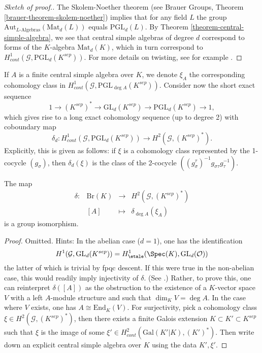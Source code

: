 \begin{proof}[Sketch of proof.]
The Skolem-Noether theorem (see
Brauer Groups, Theorem \ref{brauer-theorem-skolem-noether})
implies that for any field $L$ the group
$\text{Aut}_{L\text{-Algebras}}(\text{Mat}_d(L))$
equals $\text{PGL}_d(L)$. By
Theorem \ref{theorem-central-simple-algebra}, we see that
central simple algebras of degree $d$ correspond
to forms of the $K$-algebra $\text{Mat}_d(K)$, which in turn correspond to
$H_{cont}^1 (\mathcal{G}, \text{PGL}_d(K^{sep}))$. For more details on
twisting, see for example
\cite{SilvermanEllipticCurves}.
\end{proof}

\noindent
If $A$ is a finite central simple algebra over $K$, we denote $\xi_A$ the
corresponding cohomology class in $H_{cont}^1 (\mathcal{G}, \text{PGL}_{\deg
A}(K^{sep}))$. Consider now the short exact sequence
$$
1 \to (K^{sep})^* \to \text{GL}_d(K^{sep}) \to \text{PGL}_d(K^{sep}) \to 1,
$$
which gives rise to a long exact cohomology sequence (up to degree 2) with
coboundary map
$$
\delta_d : H_{cont} ^1(\mathcal{G}, \text{PGL}_d(K^{sep})) \to H^2
(\mathcal{G}, (K^{sep})^*).
$$
Explicitly, this is given as follows: if $\xi$ is a cohomology class
represented by the 1-cocycle $(g_\sigma)$, then $\delta_d(\xi)$ is the class of
the 2-cocycle $((g_\sigma^\tau)^{-1} g_{\sigma \tau} g_\tau^{-1})$.

\begin{theorem}
\label{theorem-brauer-delta}
The map
$$
\begin{matrix}
\delta : & \text{Br}(K) & \longrightarrow & H^2(\mathcal{G}, (K^{sep})^*) \\
& [A] & \longmapsto & \delta_{\deg A} (\xi_A)
\end{matrix}
$$
is a group isomorphism.
\end{theorem}

\begin{proof}
Omitted. Hints: In the abelian case ($d = 1$), one has the identification
$$
H^1 (\mathcal{G}, \text{GL}_d(K^{sep})) =
H_\etale^1(\Spec(K), \text{GL}_d(\mathcal{O}))
$$
the latter of which is trivial by fpqc descent. If this were true in the
non-abelian case, this would readily imply injectivity of $\delta$. (See
\cite{SGA4.5}.) Rather, to prove this, one can reinterpret $\delta([A])$ as the
obstruction to the existence of a $K$-vector space $V$ with a left $A$-module
structure and such that $\dim_K V = \deg A$. In the case where $V$ exists, one
has $A \cong \text{End}_K(V)$. For surjectivity, pick a
cohomology class $\xi \in H^2(\mathcal{G}, (K^{sep})^*)$, then there exists a
finite Galois extension $K \subset K' \subset K^{sep}$ such that $\xi$ is
the image of some $\xi' \in H_{cont}^2(\text{Gal}(K'|K), (K')^*)$. Then write
down an explicit central simple algebra over $K$ using the data $K', \xi'$.
\end{proof}

